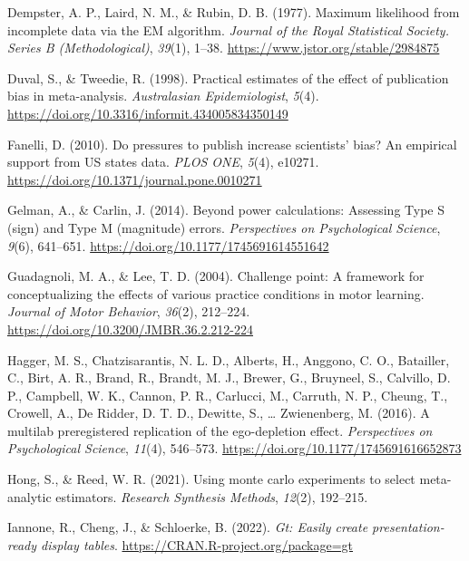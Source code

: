 \documentclass[
  man, donotrepeattitle,mask,floatsintext]{apa7}
\newlength{\cslhangindent}
\newlength{\cslentryspacingunit} %
\newenvironment{CSLReferences}[2] %
 {%
  \setlength{\parindent}{0pt}
  \ifodd #1
  \let\oldpar\par
  \def\par{\hangindent=\cslhangindent\oldpar}
  \fi
  \setlength{\parskip}{#2\cslentryspacingunit}
 }%
 {}
\begin{document}
\begin{CSLReferences}{1}{0}
\leavevmode{}%
Dempster, A. P., Laird, N. M., \& Rubin, D. B. (1977). Maximum likelihood from incomplete data via the {EM} algorithm. \emph{Journal of the Royal Statistical Society. Series B (Methodological)}, \emph{39}(1), 1--38. \url{https://www.jstor.org/stable/2984875}

\leavevmode{}%
Duval, S., \& Tweedie, R. (1998). Practical estimates of the effect of publication bias in meta-analysis. \emph{Australasian Epidemiologist}, \emph{5}(4). \url{https://doi.org/10.3316/informit.434005834350149}

\leavevmode{}%
Fanelli, D. (2010). Do pressures to publish increase scientists' bias? An empirical support from US states data. \emph{PLOS ONE}, \emph{5}(4), e10271. \url{https://doi.org/10.1371/journal.pone.0010271}

\leavevmode{}%
Gelman, A., \& Carlin, J. (2014). Beyond power calculations: {Assessing Type S} (sign) and {Type M} (magnitude) errors. \emph{Perspectives on Psychological Science}, \emph{9}(6), 641--651. \url{https://doi.org/10.1177/1745691614551642}

\leavevmode{}%
Guadagnoli, M. A., \& Lee, T. D. (2004). Challenge point: A framework for conceptualizing the effects of various practice conditions in motor learning. \emph{Journal of Motor Behavior}, \emph{36}(2), 212--224. \url{https://doi.org/10.3200/JMBR.36.2.212-224}

\leavevmode{}%
Hagger, M. S., Chatzisarantis, N. L. D., Alberts, H., Anggono, C. O., Batailler, C., Birt, A. R., Brand, R., Brandt, M. J., Brewer, G., Bruyneel, S., Calvillo, D. P., Campbell, W. K., Cannon, P. R., Carlucci, M., Carruth, N. P., Cheung, T., Crowell, A., De Ridder, D. T. D., Dewitte, S., \ldots{} Zwienenberg, M. (2016). A multilab preregistered replication of the ego-depletion effect. \emph{Perspectives on Psychological Science}, \emph{11}(4), 546--573. \url{https://doi.org/10.1177/1745691616652873}

\leavevmode{}%
Hong, S., \& Reed, W. R. (2021). Using monte carlo experiments to select meta-analytic estimators. \emph{Research Synthesis Methods}, \emph{12}(2), 192--215.

\leavevmode{}%
Iannone, R., Cheng, J., \& Schloerke, B. (2022). \emph{Gt: Easily create presentation-ready display tables}. \url{https://CRAN.R-project.org/package=gt}


\end{CSLReferences}
\end{document}
